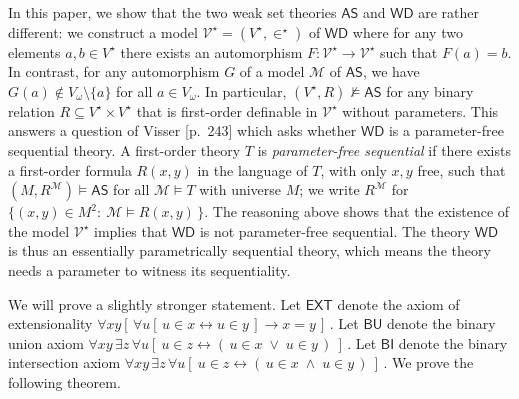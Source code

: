 \documentclass[10pt,a4paper, openany,  oldfontcommands]{memoir}
\newtheorem{open problem} [theorem] {Open Problem}
\begin{document}









In this paper, we show that the two  weak set theories  $  \mathsf{AS} $  and  $  \mathsf{WD}  $ are rather different: 
we   construct a model   $  \mathcal{V}^{  \star }  =  \left(   V^{  \star }   ,  \in^{  \star }  \right)   $  of  $  \mathsf{WD} $
where for any two elements  $ a, b  \in V^{  \star  }  $  there exists an automorphism $  F :   \mathcal{V}^{  \star }   \to   \mathcal{V}^{  \star }   $  such that  $  F(a) = b $. 
In contrast, for any automorphism  $  G $  of a model  $  \mathcal{M} $ of  $  \mathsf{AS} $, 
we have $  G( a )   \not\in  V_{  \omega }  \setminus  \lbrace a  \rbrace  $  for all $  a  \in V_{  \omega  }   $. 
In particular,  $  \left(  V^{  \star }   ,  R   \right)   \not\models  \mathsf{AS}  $ 
 for  any binary relation $  R  \subseteq  V^{  \star }  \times  V^{  \star }  $  that is 
 first-order definable  in   $     \mathcal{V}^{  \star }   $  without parameters. 
This  answers   a  question  of     Visser \cite{Visser2010}[p.~243]  which asks whether    $  \mathsf{WD} $ is a parameter-free sequential theory.
A first-order theory  $T$ is \emph{parameter-free sequential} if there exists a  first-order formula   $  R (x, y ) $  in the language of  $T$, with only $x, y $ free,  such that  $  \left(  M,   R^{  \mathcal{M} }   \right)   \models  \mathsf{AS}  $  for all  $  \mathcal{M} \models  T $   with universe $  M  $; 
we write  $  R^{  \mathcal{M} }   $  for  $  \lbrace  (x,y )  \in M^2  :  \   \mathcal{M} \models  R(x, y )   \,  \rbrace  $.
The reasoning above shows that  the existence of the model    $     \mathcal{V}^{  \star }   $ implies   that  $  \mathsf{WD} $  is not  parameter-free sequential. 
The theory   $  \mathsf{WD} $   is thus    an essentially parametrically sequential theory, 
which means the theory  needs a parameter to witness its sequentiality.










We will   prove a slightly  stronger statement. 
Let  $  \mathsf{EXT} $  denote the axiom of extensionality 
$  \forall x  y   \left[  \,   \forall u  \left[   \,  u  \in x  \leftrightarrow  u  \in y   \,   \right]    \rightarrow  x  =  y    \,    \right]     \,    $. 
Let  $  \mathsf{BU} $ denote the  binary union axiom 
$
 \forall x y  \,  \exists z   \,    \forall u    \left[    \   u  \in z  \leftrightarrow     (   \,   u \in x   \;   \vee  \;  u  \in y    \,  )      \       \right]       
\,      $. 
Let  $  \mathsf{BI} $ denote the  binary intersection axiom 
$
 \forall x y  \,  \exists z   \,    \forall u    \left[    \   u  \in z  \leftrightarrow     (   \,   u \in x   \;   \wedge  \;  u  \in y    \,  )      \       \right]       
\,      $. 
We  prove the following theorem. 
\end{document}

